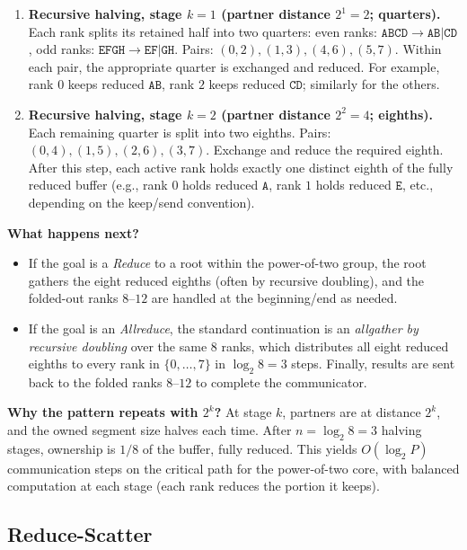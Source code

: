 \documentclass[12pt]{book}
\begin{document}
\begin{enumerate}
  \item \textbf{Recursive halving, stage \(k=1\) (partner distance \(2^1=2\); quarters).}
  Each rank splits its retained half into two quarters:
  even ranks: \(\texttt{ABCD} \to \texttt{AB}|\texttt{CD}\),
  odd ranks: \(\texttt{EFGH} \to \texttt{EF}|\texttt{GH}\).
  Pairs: \((0,2),(1,3),(4,6),(5,7)\).
  Within each pair, the appropriate quarter is exchanged and reduced.
  For example, rank \(0\) keeps reduced \(\texttt{AB}\), rank \(2\) keeps reduced \(\texttt{CD}\); similarly for the others.

  \item \textbf{Recursive halving, stage \(k=2\) (partner distance \(2^2=4\); eighths).}
  Each remaining quarter is split into two eighths.
  Pairs: \((0,4),(1,5),(2,6),(3,7)\).
  Exchange and reduce the required eighth.
  After this step, each active rank holds exactly one distinct eighth of the fully reduced buffer
  (e.g., rank \(0\) holds reduced \(\texttt{A}\), rank \(1\) holds reduced \(\texttt{E}\), etc.,
  depending on the keep/send convention).
\end{enumerate}

\noindent
\textbf{What happens next?}
\begin{itemize}
  \item If the goal is a \emph{Reduce} to a root within the power-of-two group, the root gathers the eight reduced eighths
        (often by recursive doubling), and the folded-out ranks \(8\)–\(12\) are handled at the beginning/end as needed.
  \item If the goal is an \emph{Allreduce}, the standard continuation is an \emph{allgather by recursive doubling} over the same \(8\) ranks,
        which distributes all eight reduced eighths to every rank in \(\{0,\ldots,7\}\) in \(\log_2 8=3\) steps.
        Finally, results are sent back to the folded ranks \(8\)–\(12\) to complete the communicator.
\end{itemize}

\noindent
\textbf{Why the pattern repeats with \(2^k\)?}
At stage \(k\), partners are at distance \(2^k\), and the owned segment size halves each time.
After \(n=\log_2 8=3\) halving stages, ownership is \(1/8\) of the buffer, fully reduced.
This yields \(O(\log_2 P)\) communication steps on the critical path for the power-of-two core,
with balanced computation at each stage (each rank reduces the portion it keeps).

\subsection{Reduce-Scatter}
\end{document}
